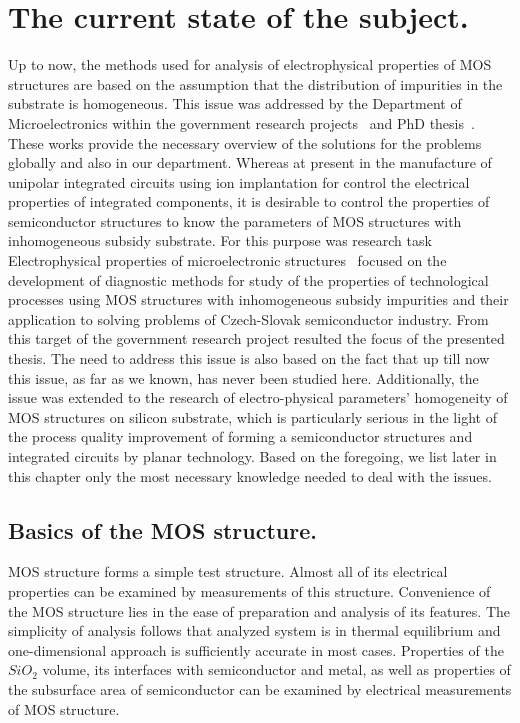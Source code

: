 \chapter{The current state of the subject.}%
\label{Chapter1}

Up to now, the methods used for analysis of electrophysical properties
of MOS structures are based on the assumption that the distribution of
impurities in the substrate is homogeneous. This issue was addressed
by the Department of Microelectronics within the government research
projects~\cite{1.1,1.2} and PhD thesis~\cite{1.5,1.6,1.7,1.8}. These
works provide the necessary overview of the solutions for the problems
globally and also in our department. Whereas at present in the
manufacture of unipolar integrated circuits using ion implantation for
control the electrical properties of integrated components, it is
desirable to control the properties of semiconductor structures to
know the parameters of MOS structures with inhomogeneous subsidy
substrate. For this purpose was research task Electrophysical
properties of microelectronic structures~\cite{1.3,1.4} focused on the
development of diagnostic methods for study of the properties of
technological processes using MOS structures with inhomogeneous
subsidy impurities and their application to solving problems of
Czech-Slovak semiconductor industry. From this target of the government
research project resulted the focus of the presented thesis. The need
to address this issue is also based on the fact that up till now this
issue, as far as we known, has never been studied here. Additionally,
the issue was extended to the research of electro-physical parameters'
homogeneity of MOS structures on silicon substrate, which is
particularly serious in the light of the process quality improvement
of forming a semiconductor structures and integrated circuits by
planar technology. Based on the foregoing, we list later in this
chapter only the most necessary knowledge needed to deal with the
issues.

\section{Basics of the MOS structure.}

MOS structure forms a simple test structure. Almost all of its
electrical properties can be examined by measurements of this
structure. Convenience of the MOS structure lies in the ease of
preparation and analysis of its features. The simplicity of analysis
follows that analyzed system is in thermal equilibrium and
one-dimensional approach is sufficiently accurate in most
cases. Properties of the $SiO_2$ volume, its interfaces with
semiconductor and metal, as well as properties of the subsurface area
of semiconductor can be examined by electrical measurements of MOS
structure.

